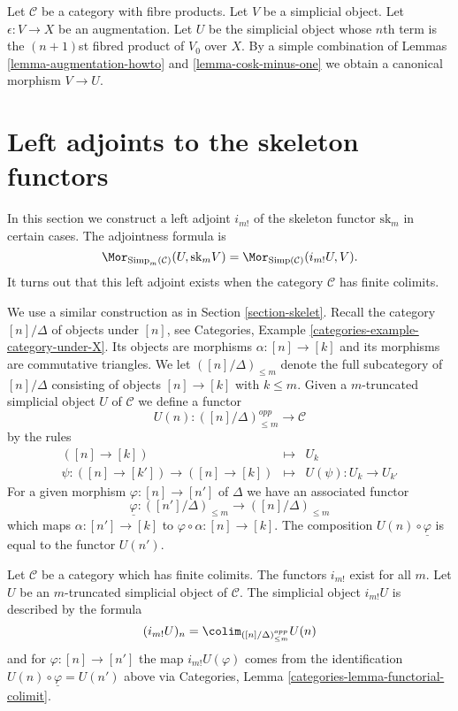 \begin{remark}
\label{remark-augmentation}
Let $\mathcal{C}$ be a category with fibre products.
Let $V$ be a simplicial object.
Let $\epsilon : V \to X$ be an augmentation.
Let $U$ be the simplicial object whose $n$th term
is the $(n + 1)$st fibred product of $V_0$ over $X$.
By a simple combination of
Lemmas \ref{lemma-augmentation-howto} and \ref{lemma-cosk-minus-one}
we  obtain a canonical morphism
$V \to U$.
\end{remark}





\section{Left adjoints to the skeleton functors}
\label{section-adjoint-left}

\noindent
In this section we construct a left adjoint $i_{m!}$
of the skeleton functor $\text{sk}_m$ in certain cases.
The adjointness formula is
$$
\Mor_{\text{Simp}_m(\mathcal{C})}(U, \text{sk}_mV)
=
\Mor_{\text{Simp}(\mathcal{C})}(i_{m!}U, V).
$$
It turns out that this left adjoint exists when
the category $\mathcal{C}$ has finite colimits.

\medskip\noindent
We use a similar construction as in Section \ref{section-skelet}.
Recall the category $[n]/\Delta$ of objects
under $[n]$, see
Categories, Example \ref{categories-example-category-under-X}.
Its objects are morphisms $\alpha : [n] \to [k]$
and its morphisms are commutative triangles.
We let $([n]/\Delta)_{\leq m}$ denote the full subcategory
of $[n]/\Delta$ consisting of objects $[n] \to [k]$
with $k \leq m$. Given a $m$-truncated
simplicial object $U$ of $\mathcal{C}$
we define a functor
$$
U(n) : ([n]/\Delta)_{\leq m}^{opp} \longrightarrow \mathcal{C}
$$
by the rules
\begin{eqnarray*}
([n] \to [k]) & \longmapsto & U_k \\
\psi : ([n] \to [k']) \to ([n] \to [k])
& \longmapsto &
U(\psi) : U_k \to U_{k'}
\end{eqnarray*}
For a given morphism $\varphi : [n] \to [n']$ of $\Delta$
we have an associated functor
$$
\underline{\varphi} :
([n']/\Delta)_{\leq m}
\longrightarrow
([n]/\Delta)_{\leq m}
$$
which maps $\alpha : [n'] \to [k]$ to
$\varphi \circ \alpha : [n] \to [k]$.
The composition $U(n) \circ \underline{\varphi}$ is
equal to the functor $U(n')$.

\begin{lemma}
\label{lemma-left-adjoint-exists}
Let $\mathcal{C}$ be a category which has finite colimits.
The functors $i_{m!}$ exist for all $m$.
Let $U$ be an $m$-truncated simplicial object of $\mathcal{C}$.
The simplicial object $i_{m!}U$
is described by the formula
$$
(i_{m!}U)_n = \colim_{([n]/\Delta)_{\leq m}^{opp}} U(n)
$$
and for $\varphi : [n] \to [n']$ the map
$i_{m!}U(\varphi)$ comes from the
identification $U(n) \circ \underline{\varphi} = U(n')$ above
via Categories, Lemma \ref{categories-lemma-functorial-colimit}.
\end{lemma}

